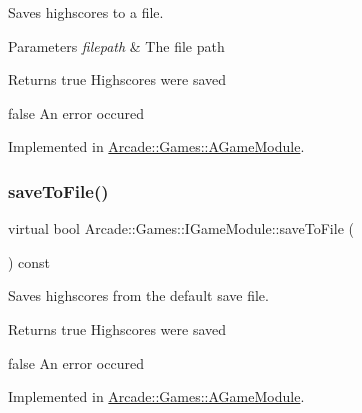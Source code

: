 Saves highscores to a file. 


\begin{DoxyParams}{Parameters}
{\em filepath} & The file path \\
\hline
\end{DoxyParams}
\begin{DoxyReturn}{Returns}
true Highscores were saved 

false An error occured 
\end{DoxyReturn}


Implemented in \mbox{\hyperlink{classArcade_1_1Games_1_1AGameModule_a16425d9ca7518acbc60fbece4a974009}{Arcade\+::\+Games\+::\+A\+Game\+Module}}.

\mbox{\label{classArcade_1_1Games_1_1IGameModule_ada0aa1d3d52bcdedcdb35b95d956c8ee}} 
\subsubsection{\texorpdfstring{saveToFile()}{saveToFile()}\hspace{0.1cm}{\footnotesize\ttfamily [2/2]}}
{\footnotesize\ttfamily virtual bool Arcade\+::\+Games\+::\+I\+Game\+Module\+::save\+To\+File (\begin{DoxyParamCaption}{ }\end{DoxyParamCaption}) const\hspace{0.3cm}{\ttfamily [pure virtual]}}



Saves highscores from the default save file. 

\begin{DoxyReturn}{Returns}
true Highscores were saved 

false An error occured 
\end{DoxyReturn}


Implemented in \mbox{\hyperlink{classArcade_1_1Games_1_1AGameModule_a82fdd06480edd7f727504f5073730812}{Arcade\+::\+Games\+::\+A\+Game\+Module}}.

\mbox{\label{classArcade_1_1Games_1_1IGameModule_aad433296fe8a4582ebfdad5827a13d59}} 
